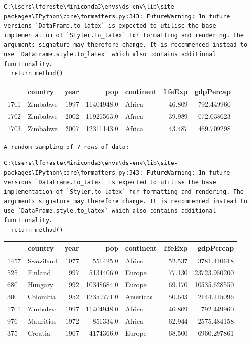 \documentclass[
  letterpaper,
  DIV=11,
  numbers=noendperiod]{scrreprt}
\begin{document}
\begin{verbatim}
C:\Users\lforeste\Miniconda3\envs\ds-env\lib\site-packages\IPython\core\formatters.py:343: FutureWarning: In future versions `DataFrame.to_latex` is expected to utilise the base implementation of `Styler.to_latex` for formatting and rendering. The arguments signature may therefore change. It is recommended instead to use `DataFrame.style.to_latex` which also contains additional functionality.
  return method()
\end{verbatim}

\begin{tabular}{llrrlrr}
\toprule
{} &   country &  year &         pop & continent &  lifeExp &   gdpPercap \\
\midrule
1701 &  Zimbabwe &  1997 &  11404948.0 &    Africa &   46.809 &  792.449960 \\
1702 &  Zimbabwe &  2002 &  11926563.0 &    Africa &   39.989 &  672.038623 \\
1703 &  Zimbabwe &  2007 &  12311143.0 &    Africa &   43.487 &  469.709298 \\
\bottomrule
\end{tabular}

\begin{verbatim}
A random sampling of 7 rows of data:
\end{verbatim}

\begin{verbatim}
C:\Users\lforeste\Miniconda3\envs\ds-env\lib\site-packages\IPython\core\formatters.py:343: FutureWarning: In future versions `DataFrame.to_latex` is expected to utilise the base implementation of `Styler.to_latex` for formatting and rendering. The arguments signature may therefore change. It is recommended instead to use `DataFrame.style.to_latex` which also contains additional functionality.
  return method()
\end{verbatim}

\begin{tabular}{llrrlrr}
\toprule
{} &    country &  year &         pop & continent &  lifeExp &     gdpPercap \\
\midrule
1457 &  Swaziland &  1977 &    551425.0 &    Africa &   52.537 &   3781.410618 \\
525  &    Finland &  1997 &   5134406.0 &    Europe &   77.130 &  23723.950200 \\
680  &    Hungary &  1992 &  10348684.0 &    Europe &   69.170 &  10535.628550 \\
300  &   Colombia &  1952 &  12350771.0 &  Americas &   50.643 &   2144.115096 \\
1701 &   Zimbabwe &  1997 &  11404948.0 &    Africa &   46.809 &    792.449960 \\
976  &  Mauritius &  1972 &    851334.0 &    Africa &   62.944 &   2575.484158 \\
375  &    Croatia &  1967 &   4174366.0 &    Europe &   68.500 &   6960.297861 \\
\bottomrule
\end{tabular}
\end{document}
